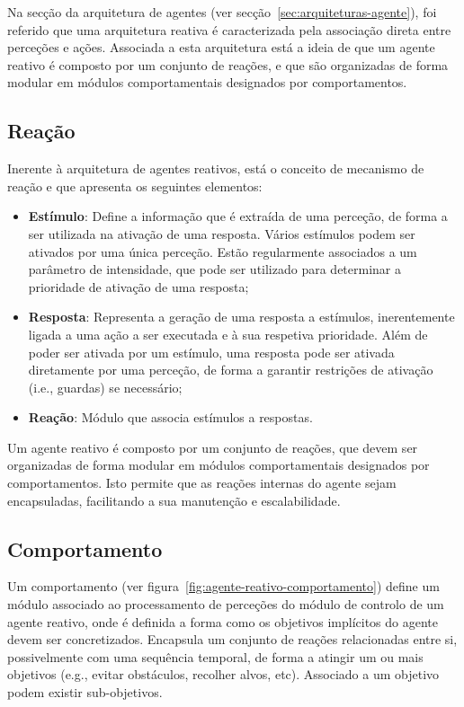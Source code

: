 Na secção da arquitetura de agentes (ver secção~\ref{sec:arquiteturas-agente}), foi referido que uma arquitetura reativa é caracterizada pela associação direta entre perceções e ações.
Associada a esta arquitetura está a ideia de que um agente reativo é composto por um conjunto de reações, e que são organizadas de forma modular em módulos comportamentais designados por comportamentos.

\subsection{Reação}\label{subsec:reacao}

Inerente à arquitetura de agentes reativos, está o conceito de mecanismo de reação e que apresenta os seguintes elementos:

\begin{itemize}
    \item \textbf{Estímulo}: Define a informação que é extraída de uma perceção, de forma a ser utilizada na ativação de uma resposta.
    Vários estímulos podem ser ativados por uma única perceção.
    Estão regularmente associados a um parâmetro de intensidade, que pode ser utilizado para determinar a prioridade de ativação de uma resposta;
    \item \textbf{Resposta}: Representa a geração de uma resposta a estímulos, inerentemente ligada a uma ação a ser executada e à sua respetiva prioridade.
    Além de poder ser ativada por um estímulo, uma resposta pode ser ativada diretamente por uma perceção, de forma a garantir restrições de ativação (i.e., guardas) se necessário;
    \item \textbf{Reação}: Módulo que associa estímulos a respostas.
\end{itemize}

Um agente reativo é composto por um conjunto de reações, que devem ser organizadas de forma modular em módulos comportamentais designados por comportamentos.
Isto permite que as reações internas do agente sejam encapsuladas, facilitando a sua manutenção e escalabilidade.

\subsection{Comportamento}\label{subsec:comportamento}

Um comportamento (ver figura~\ref{fig:agente-reativo-comportamento}) define um módulo associado ao processamento de perceções do módulo de controlo de um agente reativo, onde é definida a forma como os objetivos implícitos do agente devem ser concretizados. Encapsula um conjunto de reações relacionadas entre si, possivelmente com uma sequência temporal, de forma a atingir um ou mais objetivos (e.g., evitar obstáculos, recolher alvos, etc). Associado a um objetivo podem existir sub-objetivos.

